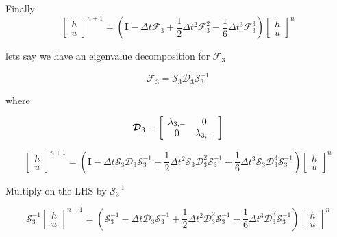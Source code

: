 \documentclass[12pt]{article}
\begin{document}
Finally
\[\left[\begin{array}{c}
h \\ u
\end{array}\right]^{n+1} = \left(\boldsymbol{I}  -  \Delta t\boldsymbol{\mathcal{F}}_3   + \frac{1}{2}\Delta t^2\boldsymbol{\mathcal{F}}_3^2- \frac{1}{6}\Delta t^3\boldsymbol{\mathcal{F}}_3^3 \right) \left[\begin{array}{c}
h \\ u
\end{array}\right]^n\]

lets say we have  an eigenvalue decomposition for $\boldsymbol{\mathcal{F}}_3 $

\[\boldsymbol{\mathcal{F}}_3 = \boldsymbol{\mathcal{S}}_3 \boldsymbol{\mathcal{D}}_3 \boldsymbol{\mathcal{S}}_3^{-1}  \]

where 

\[ \boldsymbol{\mathcal{D}}_3 = \left[\begin{array}{c c}
\lambda_{3,-}  & 0 \\0  &  \lambda_{3,+}
\end{array}\right]\]

\[\left[\begin{array}{c}
h \\ u
\end{array}\right]^{n+1} = \left(\boldsymbol{I}  -  \Delta t\boldsymbol{\mathcal{S}}_3 \boldsymbol{\mathcal{D}}_3 \boldsymbol{\mathcal{S}}_3^{-1}   + \frac{1}{2}\Delta t^2\boldsymbol{\mathcal{S}}_3 \boldsymbol{\mathcal{D}}_3^2 \boldsymbol{\mathcal{S}}_3^{-1}- \frac{1}{6}\Delta t^3\boldsymbol{\mathcal{S}}_3 \boldsymbol{\mathcal{D}}_3^3 \boldsymbol{\mathcal{S}}_3^{-1} \right) \left[\begin{array}{c}
h \\ u
\end{array}\right]^n\]

Multiply on the LHS by $\boldsymbol{\mathcal{S}}_3^{-1}$

\[\boldsymbol{\mathcal{S}}_3^{-1}\left[\begin{array}{c}
h \\ u
\end{array}\right]^{n+1} = \left(\boldsymbol{\mathcal{S}}_3^{-1} -  \Delta t \boldsymbol{\mathcal{D}}_3 \boldsymbol{\mathcal{S}}_3^{-1}   + \frac{1}{2}\Delta t^2 \boldsymbol{\mathcal{D}}_3^2 \boldsymbol{\mathcal{S}}_3^{-1}- \frac{1}{6}\Delta t^3 \boldsymbol{\mathcal{D}}_3^3 \boldsymbol{\mathcal{S}}_3^{-1} \right) \left[\begin{array}{c}
h \\ u
\end{array}\right]^n\]
\end{document}
